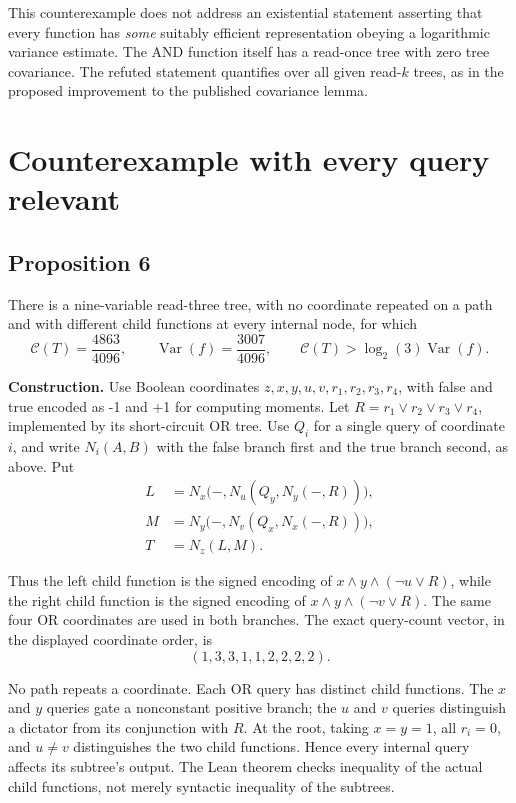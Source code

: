 \documentclass[
  american,
  11pt,
]{article}
\begin{document}
This counterexample does not address an existential statement asserting
that every function has \emph{some} suitably efficient representation
obeying a logarithmic variance estimate. The AND function itself has a
read-once tree with zero tree covariance. The refuted statement
quantifies over all given read-\(k\) trees, as in the proposed
improvement to the published covariance lemma.

\section{Counterexample with every query
relevant}\label{counterexample-with-every-query-relevant}

\subsection*{Proposition 6}\label{proposition-6}

There is a nine-variable read-three tree, with no coordinate repeated on
a path and with different child functions at every internal node, for
which \[
\mathcal C(T)=\frac{4863}{4096},\qquad
\operatorname{Var}(f)=\frac{3007}{4096},\qquad
\mathcal C(T)>\log_2(3)\operatorname{Var}(f).
\tag{19}
\]

\textbf{Construction.} Use Boolean coordinates
\(z,x,y,u,v,r_1,r_2,r_3,r_4\), with false and true encoded as -1 and +1
for computing moments. Let \(R=r_1\lor r_2\lor r_3\lor r_4\),
implemented by its short-circuit OR tree. Use \(Q_i\) for a single query
of coordinate \(i\), and write \(N_i(A,B)\) with the false branch first
and the true branch second, as above. Put \[
\begin{aligned}
L&=N_x\bigl(-,N_u(Q_y,N_y(-,R))\bigr),\\
M&=N_y\bigl(-,N_v(Q_x,N_x(-,R))\bigr),\\
T&=N_z(L,M).
\end{aligned}
\tag{20}
\]

Thus the left child function is the signed encoding of
\(x\land y\land(\neg u\lor R)\), while the right child function is the
signed encoding of \(x\land y\land(\neg v\lor R)\). The same four OR
coordinates are used in both branches. The exact query-count vector, in
the displayed coordinate order, is \[
(1,3,3,1,1,2,2,2,2).
\tag{21}
\]

No path repeats a coordinate. Each OR query has distinct child
functions. The \(x\) and \(y\) queries gate a nonconstant positive
branch; the \(u\) and \(v\) queries distinguish a dictator from its
conjunction with \(R\). At the root, taking \(x=y=1\), all \(r_i=0\),
and \(u\ne v\) distinguishes the two child functions. Hence every
internal query affects its subtree's output. The Lean theorem checks
inequality of the actual child functions, not merely syntactic
inequality of the subtrees.
\end{document}
